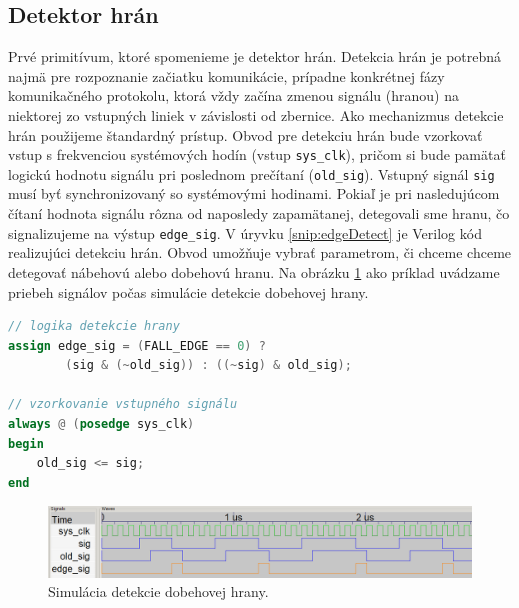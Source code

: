\subsection{Detektor hrán} \label{subsek:edgeDetector}
Prvé primitívum, ktoré spomenieme je detektor hrán. Detekcia hrán je potrebná najmä pre rozpoznanie začiatku komunikácie, prípadne konkrétnej fázy komunikačného protokolu, ktorá vždy začína zmenou signálu (hranou) na niektorej zo vstupných liniek v závislosti od zbernice. Ako mechanizmus detekcie hrán použijeme štandardný prístup. Obvod pre detekciu hrán bude vzorkovať vstup s frekvenciou systémových hodín (vstup \texttt{sys\_clk}), pričom si bude pamätať logickú hodnotu signálu pri poslednom prečítaní (\texttt{old\_sig}). Vstupný signál \texttt{sig} musí byť synchronizovaný so systémovými hodinami. Pokiaľ je pri nasledujúcom čítaní hodnota signálu rôzna od naposledy zapamätanej, detegovali sme hranu, čo signalizujeme na výstup \texttt{edge\_sig}. V úryvku \ref{snip:edgeDetect} je Verilog kód realizujúci detekciu hrán. Obvod umožňuje vybrať parametrom, či chceme chceme detegovať nábehovú alebo dobehovú hranu. Na obrázku \ref{obr:edgeDetectSim} ako príklad uvádzame priebeh signálov počas simulácie detekcie dobehovej hrany.

\begin{lstlisting}[float,language=Verilog,caption={Verilog kód pre detekciu hrán. Parameter \texttt{FALL\_EDGE} určuje, či detegujeme dobehovú alebo nábehovú hranu.},label=snip:edgeDetect]
// logika detekcie hrany
assign edge_sig = (FALL_EDGE == 0) ?
        (sig & (~old_sig)) : ((~sig) & old_sig);

// vzorkovanie vstupného signálu
always @ (posedge sys_clk)
begin
    old_sig <= sig;
end
\end{lstlisting}

\begin{figure}
    \centerline{\includegraphics[width=1\textwidth]{images/simulations/edgeDetectSim.png}}
    \caption[Simulácia detekcie dobehovej hrany]{Simulácia detekcie dobehovej hrany.}
    \label{obr:edgeDetectSim}
\end{figure}

